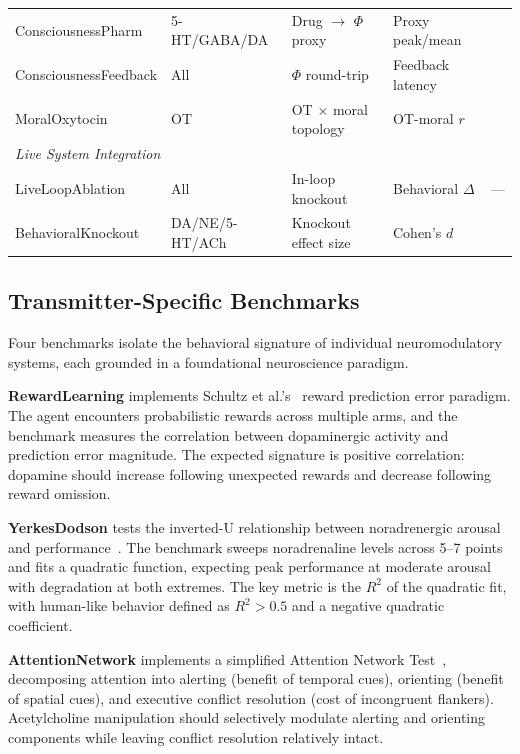 \documentclass[11pt,letterpaper]{article}
\begin{document}
\begin{table}[t]
\begin{tabular}{@{}p{2.5cm}p{2.1cm}p{2.3cm}p{2.1cm}p{2.6cm}@{}}
ConsciousnessPharm & 5-HT/GABA/DA & Drug $\to$ $\Phi$ proxy & Proxy peak/mean & \citet{tononi2004information} \\
ConsciousnessFeedback & All & $\Phi$ round-trip & Feedback latency & \citet{oizumi2014phenomenology} \\
MoralOxytocin & OT & OT $\times$ moral topology & OT-moral $r$ & \citet{feldman2012oxytocin} \\
\midrule
\multicolumn{5}{l}{\emph{Live System Integration}} \\
LiveLoopAblation & All & In-loop knockout & Behavioral $\Delta$ & --- \\
BehavioralKnockout & DA/NE/5-HT/ACh & Knockout effect size & Cohen's $d$ & \citet{doya2002metalearning} \\
\bottomrule
\end{tabular}
\end{table}

\subsection{Transmitter-Specific Benchmarks}

Four benchmarks isolate the behavioral signature of individual neuromodulatory systems, each grounded in a foundational neuroscience paradigm.

\textbf{RewardLearning} implements Schultz et al.'s~\citep{schultz1997dopamine} reward prediction error paradigm. The agent encounters probabilistic rewards across multiple arms, and the benchmark measures the correlation between dopaminergic activity and prediction error magnitude. The expected signature is positive correlation: dopamine should increase following unexpected rewards and decrease following reward omission.

\textbf{YerkesDodson} tests the inverted-U relationship between noradrenergic arousal and performance~\citep{yerkes1908relation}. The benchmark sweeps noradrenaline levels across 5--7 points and fits a quadratic function, expecting peak performance at moderate arousal with degradation at both extremes. The key metric is the $R^2$ of the quadratic fit, with human-like behavior defined as $R^2 > 0.5$ and a negative quadratic coefficient.

\textbf{AttentionNetwork} implements a simplified Attention Network Test~\citep{posner1990attention}, decomposing attention into alerting (benefit of temporal cues), orienting (benefit of spatial cues), and executive conflict resolution (cost of incongruent flankers). Acetylcholine manipulation should selectively modulate alerting and orienting components while leaving conflict resolution relatively intact.
\end{document}
